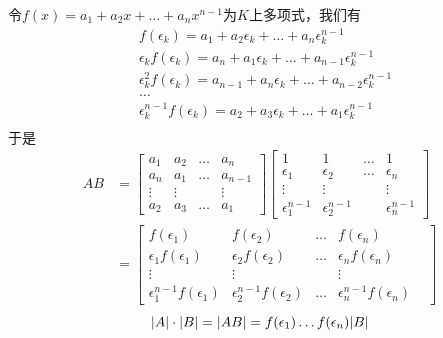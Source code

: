 \documentclass[11pt]{article}
\begin{document}
\begin{examplle}[]
令\(f(x)=a_1+a_2x+\dots+a_nx^{n-1}\)为\(K\)上多项式，我们有
\begin{align*}
&f(\epsilon_k)=a_1+a_2\epsilon_k+\dots+a_n\epsilon_k^{n-1}\\
&\epsilon_k f(\epsilon_k)=a_n+a_1\epsilon_k+\dots+a_{n-1}\epsilon_k^{n-1}\\
&\epsilon_k^2 f(\epsilon_k)=a_{n-1}+a_n\epsilon_k+\dots+a_{n-2}\epsilon_k^{n-1}\\
&\dots\\
&\epsilon_k^{n-1}f(\epsilon_k)=a_2+a_3\epsilon_k+\dots+a_1\epsilon_k^{n-1}\\
\end{align*}
于是
\begin{align*}
AB&=
\begin{bmatrix}
a_1&a_2&\dots&a_n\\
a_n&a_1&\dots&a_{n-1}    \\
\vdots&\vdots&&\vdots\\
a_2&a_3&\dots&a_1
\end{bmatrix}
\begin{bmatrix}
1&1&\dots&1\\
\epsilon_1&\epsilon_2&\dots&\epsilon_n\\
\vdots&\vdots&&\vdots\\
\epsilon_1^{n-1}&\epsilon_2^{n-1}&&
\epsilon_n^{n-1}
\end{bmatrix}\\
&=
\begin{bmatrix}
f(\epsilon_1)&f(\epsilon_2)&\dots&f(\epsilon_n)\\
\epsilon_1 f(\epsilon_1)&\epsilon_2 f(\epsilon_2)&\dots&
\epsilon_nf(\epsilon_n)\\
\vdots&\vdots&&\vdots\\
\epsilon_1^{n-1}f(\epsilon_1)&
\epsilon_2^{n-1}f(\epsilon_2)&
\dots&
\epsilon_n^{n-1}f(\epsilon_n)&
\end{bmatrix}
\end{align*}
\begin{equation*}
\abs{A}\cdot\abs{B}=\abs{AB}=f(\epsilon_1)\dots f(\epsilon_n)\abs{B}
\end{equation*}
\end{examplle}
\end{document}
